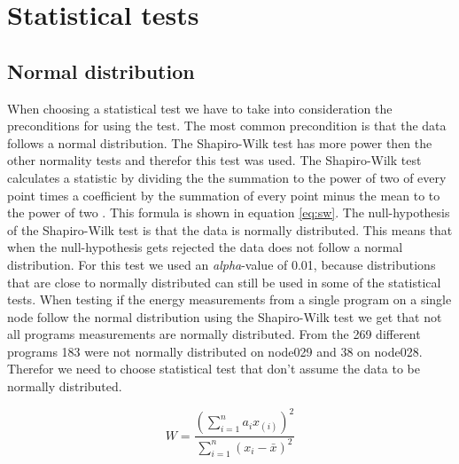 \chapter{Statistical tests}
\label{ch:statistics}


\section{Normal distribution}
When choosing a statistical test we have to take into consideration the preconditions for using the test. The most common precondition is that the data follows a normal distribution. The Shapiro-Wilk test has more power then the other normality tests \cite{razali2011power} and therefor this test was used. The Shapiro-Wilk test calculates a statistic by dividing the the summation to the power of two of every point times a coefficient by the summation of  every point minus the mean to to the power of two \cite{shapiro1965analysis}. This formula is shown in equation \ref{eq:sw}. The null-hypothesis of the Shapiro-Wilk test is that the data is normally distributed. This means that when the null-hypothesis gets rejected the data does not follow a normal distribution. For this test we used an \textit{alpha}-value of 0.01, because distributions that are close to normally distributed can still be used in some of the statistical tests. When testing if the energy measurements from a single program on a single node follow the normal distribution using the Shapiro-Wilk test we get that not all programs measurements are normally distributed. From the 269 different programs 183 were not normally distributed on node029 and 38 on node028. Therefor we need to choose statistical test that don't assume the data to be normally distributed.

\begin{equation}
    W = \frac{(\sum_{i=1}^{n} a_{i}x_{(i)})^2}{\sum_{i=1}^{n} (x_{i} - \bar x)^2}
    \label{eq:sw}
\end{equation}


